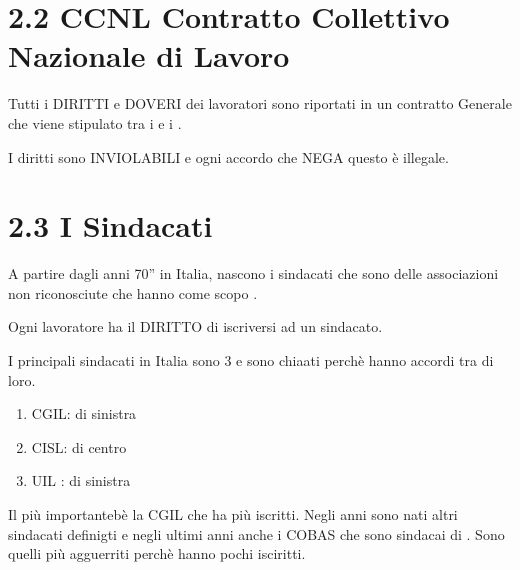 \documentclass[letterpaper,10pt,italian]{sphinxmanual}
\begin{document}
\section{2.2 \sphinxhyphen{} CCNL \sphinxhyphen{} Contratto Collettivo Nazionale di Lavoro}
\label{\detokenize{2.DIRITTI ECONOMICI-LAVORO:ccnl-contratto-collettivo-nazionale-di-lavoro}}
\sphinxAtStartPar
Tutti i DIRITTI e DOVERI dei lavoratori sono riportati in un contratto Generale che viene stipulato tra i
 e i .

\sphinxAtStartPar
I diritti sono INVIOLABILI e ogni accordo che NEGA questo è illegale.


\section{2.3 \sphinxhyphen{} I Sindacati}
\label{\detokenize{2.DIRITTI ECONOMICI-LAVORO:i-sindacati}}
\sphinxAtStartPar
A partire dagli anni 70” in Italia, nascono i sindacati che sono delle associazioni non riconosciute che hanno come scopo .

\sphinxAtStartPar
Ogni lavoratore ha il DIRITTO di iscriversi ad un sindacato.

\sphinxAtStartPar
I principali sindacati in Italia sono 3 e sono chiaati  perchè hanno accordi tra di loro.
\begin{enumerate}
%
\item {} 
\sphinxAtStartPar
CGIL:\sphinxhyphen{} di sinistra

\item {} 
\sphinxAtStartPar
CISL:\sphinxhyphen{} di centro

\item {} 
\sphinxAtStartPar
UIL :\sphinxhyphen{} di sinistra

\end{enumerate}

\sphinxAtStartPar
Il più importantebè la CGIL che ha più iscritti.
Negli anni sono nati altri sindacati definigti  e negli ultimi anni anche i COBAS che sono sindacai di .
Sono quelli più agguerriti perchè hanno pochi isciritti.
\end{document}
